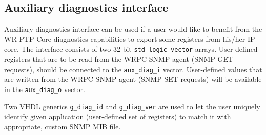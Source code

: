 \subsection{Auxiliary diagnostics interface}
\label{sec:aux_diag}

Auxiliary diagnostics interface can be used if a user would like to benefit from
the WR PTP Core diagnostics capabilities to export some registers from his/her
IP core. The interface consists of two 32-bit \texttt{std\_logic\_vector}
arrays. User-defined registers that are to be read from the WRPC SNMP agent (SNMP
GET requests), should be connected to the \texttt{aux\_diag\_i} vector.
User-defined values that are written from the WRPC SNMP agent (SNMP SET
requests) will be available in the \texttt{aux\_diag\_o} vector.

Two VHDL generics \texttt{g\_diag\_id} and \texttt{g\_diag\_ver} are used to let
the user uniquely identify given application (user-defined set of registers)
to match it with appropriate, custom SNMP MIB file.
